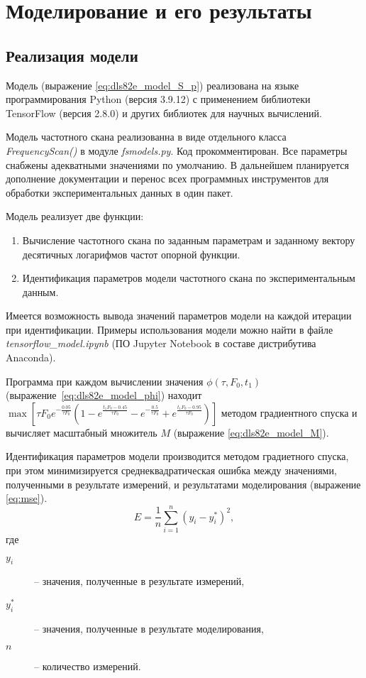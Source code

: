 \section{Моделирование и его результаты}
	

	\subsection{Реализация модели}
	Модель (выражение \ref{eq:dls82e_model_S_p}) реализована на 
	языке программирования Python (версия 3.9.12) с применением 
	библиотеки TensorFlow (версия 2.8.0) и других библиотек	для научных
	вычислений.

	Модель частотного скана реализованна в виде отдельного класса \\
	\emph{FrequencyScan()} в модуле \emph{fsmodels.py}. Код 
	прокомментирован. Все параметры снабжены адекватными значениями по 
	умолчанию. В дальнейшем планируется дополнение документации и 
	перенос всех программных инструментов для обработки 
	экспериментальных данных в один пакет.

	Модель реализует две функции:
	\begin{enumerate}
		\item Вычисление частотного скана по заданным параметрам и 
		заданному вектору десятичных логарифмов частот опорной функции.
		\item Идентификация параметров модели частотного скана по 
		экспериментальным данным.
	\end{enumerate}
	Имеется возможность вывода значений параметров модели на каждой 
	итерации при идентификации. Примеры использования модели можно найти
	в файле \emph{tensorflow\_model.ipynb} (ПО Jupyter Notebook в составе 
	дистрибутива Anaconda).

	Программа при каждом вычислении значения $\phi\left(\tau,F_0,
	t_1\right)$	(выражение~\ref{eq:dls82e_model_phi}) находит 
	\(%
		\max{\left[
	    \tau F_0 e^{-\frac{0.05}{\tau F_0}}
	    \left(1-e^{\frac{t_1 F_0-0.45}{\tau F_0}}
	    -e^{-\frac{0.5}{\tau F_0}}+
	    e^{\frac{t_1 F_0-0.95}{\tau F_0}}\right)
	    \right]}
    \)%
	методом	градиентного спуска и вычисляет масштабный множитель $M$ 
	(выражение \ref{eq:dls82e_model_M}).

	Идентификация параметров модели производится методом градиетного 
	спуска, при этом минимизируется среднеквадратическая ошибка между 
	значениями, полученными в результате измерений, и результатами 
	моделирования (выражение \ref{eq:mse}).
	\begin{equation}
		\label{eq:mse}
		E = \frac{1}{n}\sum_{i=1}^{n}\left(y_i - y_i^*\right)^2,
	\end{equation}
	где
	\begin{description}
		\item[$y_i$] -- значения, полученные в результате измерений,
		\item[$y_i^*$] -- значения, полученные в результате моделирования,
		\item[$n$] -- количество измерений.
	\end{description}

